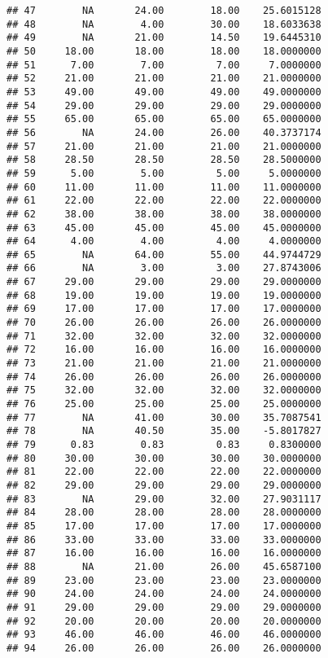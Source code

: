 \documentclass[
]{article}
\begin{document}
\begin{verbatim}
## 47        NA       24.00        18.00    25.6015128
## 48        NA        4.00        30.00    18.6033638
## 49        NA       21.00        14.50    19.6445310
## 50     18.00       18.00        18.00    18.0000000
## 51      7.00        7.00         7.00     7.0000000
## 52     21.00       21.00        21.00    21.0000000
## 53     49.00       49.00        49.00    49.0000000
## 54     29.00       29.00        29.00    29.0000000
## 55     65.00       65.00        65.00    65.0000000
## 56        NA       24.00        26.00    40.3737174
## 57     21.00       21.00        21.00    21.0000000
## 58     28.50       28.50        28.50    28.5000000
## 59      5.00        5.00         5.00     5.0000000
## 60     11.00       11.00        11.00    11.0000000
## 61     22.00       22.00        22.00    22.0000000
## 62     38.00       38.00        38.00    38.0000000
## 63     45.00       45.00        45.00    45.0000000
## 64      4.00        4.00         4.00     4.0000000
## 65        NA       64.00        55.00    44.9744729
## 66        NA        3.00         3.00    27.8743006
## 67     29.00       29.00        29.00    29.0000000
## 68     19.00       19.00        19.00    19.0000000
## 69     17.00       17.00        17.00    17.0000000
## 70     26.00       26.00        26.00    26.0000000
## 71     32.00       32.00        32.00    32.0000000
## 72     16.00       16.00        16.00    16.0000000
## 73     21.00       21.00        21.00    21.0000000
## 74     26.00       26.00        26.00    26.0000000
## 75     32.00       32.00        32.00    32.0000000
## 76     25.00       25.00        25.00    25.0000000
## 77        NA       41.00        30.00    35.7087541
## 78        NA       40.50        35.00    -5.8017827
## 79      0.83        0.83         0.83     0.8300000
## 80     30.00       30.00        30.00    30.0000000
## 81     22.00       22.00        22.00    22.0000000
## 82     29.00       29.00        29.00    29.0000000
## 83        NA       29.00        32.00    27.9031117
## 84     28.00       28.00        28.00    28.0000000
## 85     17.00       17.00        17.00    17.0000000
## 86     33.00       33.00        33.00    33.0000000
## 87     16.00       16.00        16.00    16.0000000
## 88        NA       21.00        26.00    45.6587100
## 89     23.00       23.00        23.00    23.0000000
## 90     24.00       24.00        24.00    24.0000000
## 91     29.00       29.00        29.00    29.0000000
## 92     20.00       20.00        20.00    20.0000000
## 93     46.00       46.00        46.00    46.0000000
## 94     26.00       26.00        26.00    26.0000000

\end{verbatim}
\end{document}
